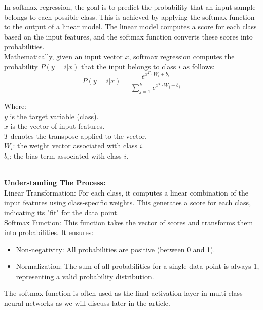 \documentclass{article}
\begin{document}
In softmax regression, the goal is to predict the probability that an input sample belongs to each possible class. This is achieved by applying the softmax function to the output of a linear model. The linear model computes a score for each class based on the input features, and the softmax function converts these scores into probabilities.\\

Mathematically, given an input vector ${x}$, softmax regression computes the probability ${P(y=i | x)}$ that the input belongs to class ${i}$ as follows:
$${P(y=i | x) = \frac{e^{x^{T} \cdot W_i + b_i}}{\sum_{j=1}^{k} e^{x^{T} \cdot W_j + b_j}}
        }$$

\noindent\hspace*{10mm}
\begin{minipage}{\dimexpr\linewidth-20mm}
    Where:\\
    ${y}$ is the target variable (class).\\
    ${x}$ is the vector of input features.\\
    ${T}$ denotes the transpose applied to the vector.\\
    ${W_i}$: the weight vector associated with class ${i}$.\\
    ${b_i}$: the bias term associated with class ${i}$.\\
\end{minipage}\\
\textbf{Understanding The Process:}\hfill\newline\\
Linear Transformation: For each class, it computes a linear combination of the input features using class-specific weights. This generates a score for each class, indicating its "fit" for the data point.\hfill\newline\\
Softmax Function: This function takes the vector of scores and transforms them into probabilities. It ensures:
\begin{itemize}
    \item Non-negativity: All probabilities are positive (between 0 and 1).
\end{itemize}
\begin{itemize}
    \item Normalization: The sum of all probabilities for a single data point is always 1, representing a valid probability distribution.
\end{itemize}
The softmax function is often used as the final activation layer in multi-class neural networks as we will discuss later in the article.
\end{document}

